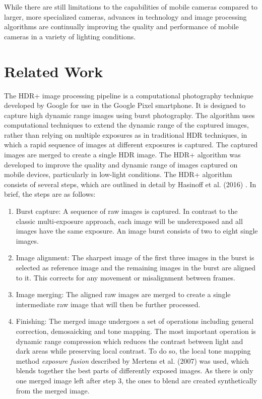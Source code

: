 \documentclass{egpubl}
\begin{document}
While there are still limitations to the capabilities of mobile cameras compared to larger, 
more specialized cameras, advances in technology and image processing algorithms are 
continually improving the quality and performance of mobile cameras in a variety of 
lighting conditions.


\section{Related Work}
\label{sec:related_work}

The HDR+ image processing pipeline is a computational photography technique developed by Google for use 
in the Google Pixel smartphone. It is designed to capture high dynamic range images using 
burst photography. The algorithm uses computational techniques to extend the dynamic range 
of the captured images, rather than relying on multiple exposures as in traditional 
HDR techniques, in which a rapid sequence of images at different exposures is captured.
The captured images are merged to create a single HDR image. The HDR+ algorithm was developed 
to improve the quality and dynamic range of images captured on mobile devices, particularly in 
low-light conditions. The HDR+ algorithm consists of several steps, which are outlined in detail 
by Hasinoff et al. (2016) \cite{Hasinoff2016burst}. In brief, the steps are as follows:

\begin{enumerate}
    \item Burst capture: A sequence of raw images is captured. In contrast to the classic 
          multi-exposure approach, each image will be underexposed and all images have the
          same exposure. An image burst consists of two to eight single images.
    \item Image alignment: The sharpest image of the first three images in the burst is 
          selected as reference image and the remaining images in the burst are aligned 
          to it. This corrects for any movement or misalignment between frames.
    \item Image merging: The aligned raw images are merged to create a single intermediate 
          raw image that will then be further processed.
    \item Finishing: The merged image undergoes a set of operations including general
          correction, demosaicking and tone mapping. The most important operation is
          dynamic range compression which reduces the contrast between light and dark
          areas while preserving local contrast. To do so, the local tone mapping method
          \textit{exposure fusion} described by Mertens et al. (2007) \cite{mertens2007exposure} 
          was used, which blends together the best parts of differently exposed images. 
          As there is only one merged image left after step 3, the ones to blend are created synthetically 
          from the merged image.
\end{enumerate}
\end{document}
